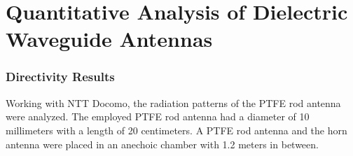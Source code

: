 \documentclass[a4paper,12pt]{report}
\begin{document}
\chapter{Quantitative Analysis of Dielectric Waveguide Antennas}

\subsection{Directivity Results}


Working with NTT Docomo,
the radiation patterns of the PTFE rod antenna were analyzed.
The employed PTFE rod antenna had a diameter of 10 millimeters
with a length of 20 centimeters.
A PTFE rod antenna and the horn antenna were placed in
an anechoic chamber with 1.2 meters in between.
\end{document}
